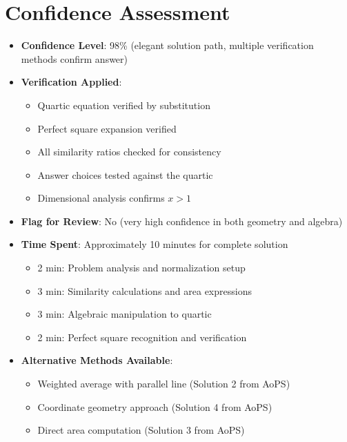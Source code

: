 \documentclass[]{article}
\begin{document}
\section*{Confidence Assessment}
\begin{itemize}[leftmargin=*]
    \item \textbf{Confidence Level}: 98\% (elegant solution path, multiple verification methods confirm answer)
    
    \item \textbf{Verification Applied}: 
    \begin{itemize}
        \item Quartic equation verified by substitution
        \item Perfect square expansion verified
        \item All similarity ratios checked for consistency
        \item Answer choices tested against the quartic
        \item Dimensional analysis confirms $x > 1$
    \end{itemize}
    
    \item \textbf{Flag for Review}: No (very high confidence in both geometry and algebra)
    
    \item \textbf{Time Spent}: Approximately 10 minutes for complete solution
    \begin{itemize}
        \item 2 min: Problem analysis and normalization setup
        \item 3 min: Similarity calculations and area expressions
        \item 3 min: Algebraic manipulation to quartic
        \item 2 min: Perfect square recognition and verification
    \end{itemize}
    
    \item \textbf{Alternative Methods Available}: 
    \begin{itemize}
        \item Weighted average with parallel line (Solution 2 from AoPS)
        \item Coordinate geometry approach (Solution 4 from AoPS)
        \item Direct area computation (Solution 3 from AoPS)
    \end{itemize}
    

\end{itemize}
\end{document}

